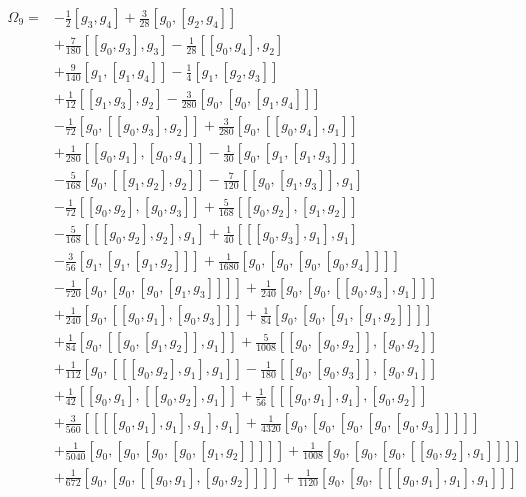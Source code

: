 \documentclass[12pt]{article}
\begin{document}
\begin{equation}
\begin{aligned}
\Omega_{9}={}&-\tfrac{1}{2}[g_{3},g_{4}]+\tfrac{3}{28}[g_{0},[g_{2},g_{4}]]\\
&+\tfrac{7}{180}[[g_{0},g_{3}],g_{3}]-\tfrac{1}{28}[[g_{0},g_{4}],g_{2}]\\
&+\tfrac{9}{140}[g_{1},[g_{1},g_{4}]]-\tfrac{1}{4}[g_{1},[g_{2},g_{3}]]\\
&+\tfrac{1}{12}[[g_{1},g_{3}],g_{2}]-\tfrac{3}{280}[g_{0},[g_{0},[g_{1},g_{4}]]]\\
&-\tfrac{1}{72}[g_{0},[[g_{0},g_{3}],g_{2}]]+\tfrac{3}{280}[g_{0},[[g_{0},g_{4}],g_{1}]]\\
&+\tfrac{1}{280}[[g_{0},g_{1}],[g_{0},g_{4}]]-\tfrac{1}{30}[g_{0},[g_{1},[g_{1},g_{3}]]]\\
&-\tfrac{5}{168}[g_{0},[[g_{1},g_{2}],g_{2}]]-\tfrac{7}{120}[[g_{0},[g_{1},g_{3}]],g_{1}]\\
&-\tfrac{1}{72}[[g_{0},g_{2}],[g_{0},g_{3}]]+\tfrac{5}{168}[[g_{0},g_{2}],[g_{1},g_{2}]]\\
&-\tfrac{5}{168}[[[g_{0},g_{2}],g_{2}],g_{1}]+\tfrac{1}{40}[[[g_{0},g_{3}],g_{1}],g_{1}]\\
&-\tfrac{3}{56}[g_{1},[g_{1},[g_{1},g_{2}]]]+\tfrac{1}{1680}[g_{0},[g_{0},[g_{0},[g_{0},g_{4}]]]]\\
&-\tfrac{1}{720}[g_{0},[g_{0},[g_{0},[g_{1},g_{3}]]]]+\tfrac{1}{240}[g_{0},[g_{0},[[g_{0},g_{3}],g_{1}]]]\\
&+\tfrac{1}{240}[g_{0},[[g_{0},g_{1}],[g_{0},g_{3}]]]+\tfrac{1}{84}[g_{0},[g_{0},[g_{1},[g_{1},g_{2}]]]]\\
&+\tfrac{1}{84}[g_{0},[[g_{0},[g_{1},g_{2}]],g_{1}]]+\tfrac{5}{1008}[[g_{0},[g_{0},g_{2}]],[g_{0},g_{2}]]\\
&+\tfrac{1}{112}[g_{0},[[[g_{0},g_{2}],g_{1}],g_{1}]]-\tfrac{1}{180}[[g_{0},[g_{0},g_{3}]],[g_{0},g_{1}]]\\
&+\tfrac{1}{42}[[g_{0},g_{1}],[[g_{0},g_{2}],g_{1}]]+\tfrac{1}{56}[[[g_{0},g_{1}],g_{1}],[g_{0},g_{2}]]\\
&+\tfrac{3}{560}[[[[g_{0},g_{1}],g_{1}],g_{1}],g_{1}]+\tfrac{1}{4320}[g_{0},[g_{0},[g_{0},[g_{0},[g_{0},g_{3}]]]]]\\
&+\tfrac{1}{5040}[g_{0},[g_{0},[g_{0},[g_{0},[g_{1},g_{2}]]]]]+\tfrac{1}{1008}[g_{0},[g_{0},[g_{0},[[g_{0},g_{2}],g_{1}]]]]\\
&+\tfrac{1}{672}[g_{0},[g_{0},[[g_{0},g_{1}],[g_{0},g_{2}]]]]+\tfrac{1}{1120}[g_{0},[g_{0},[[[g_{0},g_{1}],g_{1}],g_{1}]]]\\

\end{aligned}
\end{equation}
\end{document}
